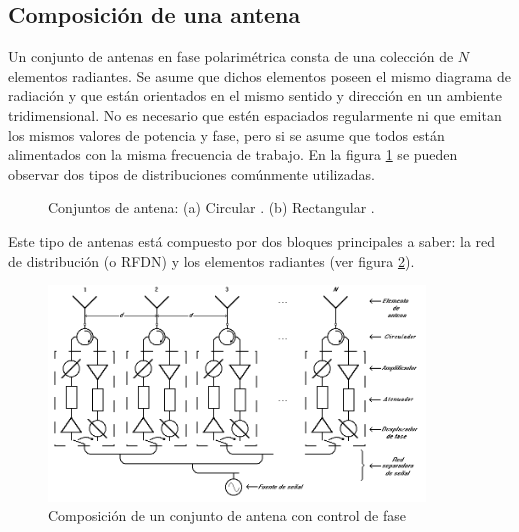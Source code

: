 \subsection{Composición de una antena}

Un conjunto de antenas en fase polarimétrica consta de una colección de $N$ elementos radiantes. Se asume que dichos elementos
poseen el mismo diagrama de radiación y que están orientados en el mismo sentido y dirección en un ambiente tridimensional. No es
necesario que estén espaciados regularmente ni que emitan los mismos valores de potencia y fase, pero si se asume
que todos están alimentados con la misma frecuencia de trabajo. En la figura \ref{fig:phasedArrayAntenna} se pueden observar
dos tipos de distribuciones comúnmente utilizadas.

\begin{figure}[H]
	\centering
		\caption{Conjuntos de antena: (a) Circular \cite{AntennaFront}. (b) Rectangular \cite{Aumann1989}.}
	\label{fig:phasedArrayAntenna}
\end{figure}

Este tipo de antenas está compuesto por dos bloques principales a saber: la red de distribución (o RFDN) y los elementos 
radiantes (ver figura \ref{fig:compositionAntenna}).

\begin{figure}[H]
 \centering
 \includegraphics[width=10cm]{gfx/CompositionAntenna.png}
 \caption{Composición de un conjunto de antena con control de fase}
 \label{fig:compositionAntenna}
\end{figure}

